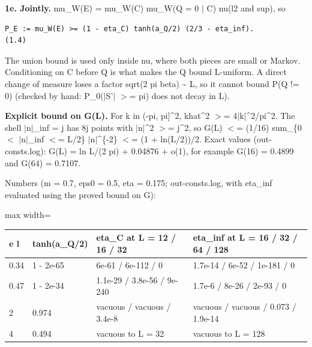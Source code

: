 \documentclass[11pt,a4paper]{article}
\begin{document}
\begin{itemize}
\end{itemize}

{\bfseries\boldmath 1e. Jointly.} mu\_W(E) = mu\_W(C) mu\_W(Q = 0 $|$ C) nu(l2 and sup), so

\begin{Verbatim}[breaklines=true,breakanywhere=true,fontsize=\small]
P_E := mu_W(E) >= (1 - eta_C) tanh(a_Q/2) (2/3 - eta_inf).                                                (1.4)
\end{Verbatim}

The union bound is used only inside nu, where both pieces are small or Markov. Conditioning on C before Q is what
makes the Q bound L-uniform. A direct change of measure loses a factor sqrt(2 pi beta) \textasciitilde{} L, so it cannot bound
P(Q != 0) (checked by hand: P\_0($|$S'$|$ $>$= pi) does not decay in L).

{\bfseries\boldmath Explicit bound on G(L).} For k in (-pi, pi]\textasciicircum{}2, khat\textasciicircum{}2 $>$= 4$|$k$|$\textasciicircum{}2/pi\textasciicircum{}2. The shell $|$n$|$\_inf = j has 8j points with
$|$n$|$\textasciicircum{}2 $>$= j\textasciicircum{}2, so G(L) $<$= (1/16) sum\_\{0 $<$ $|$n$|$\_inf $<$= L/2\} $|$n$|$\textasciicircum{}\{-2\} $<$= (1 + ln(L/2))/2. Exact values (out-consts.log):
G(L) = ln L/(2 pi) + 0.04876 + o(1), for example G(16) = 0.4899 and G(64) = 0.7107.

Numbers (m = 0.7, eps0 = 0.5, eta = 0.175; out-consts.log, with eta\_inf evaluated using the proved bound on G):

\begin{center}
\begin{adjustbox}{max width=\linewidth}
\begin{tabular}{llll}
\hline
{}{\bfseries\boldmath e l} & {\bfseries\boldmath tanh(a\_Q/2)} & {\bfseries\boldmath eta\_C at L = 12 / 16 / 32} & {\bfseries\boldmath eta\_inf at L = 16 / 32 / 64 / 128} \\
\hline
{}0.34 & 1 - 2e-65 & 6e-61 / 6e-112 / 0 & 1.7e-14 / 6e-52 / 1e-181 / 0 \\
{}0.47 & 1 - 2e-34 & 1.1e-29 / 3.8e-56 / 9e-240 & 1.7e-6 / 8e-26 / 2e-93 / 0 \\
{}2 & 0.974 & vacuous / vacuous / 3.4e-8 & vacuous / vacuous / 0.073 / 1.9e-14 \\
{}4 & 0.494 & vacuous to L = 32 & vacuous to L = 128 \\
\hline
\end{tabular}
\end{adjustbox}
\end{center}
\end{document}
